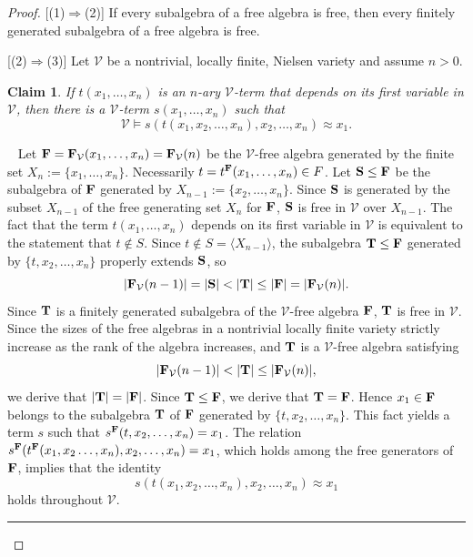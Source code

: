 \documentclass[12pt]{amsart}
\newtheorem{clm}[thm]{Claim}
\theoremstyle{definition}
\numberwithin{equation}{section}
\newcommand{\cproof}{\noindent{\it Proof of Claim.}\ } %
\newcommand{\cqed}{\hfill\rule{1.3mm}{3mm}}
\newcommand{\m}[1]{{\mathbf{\uppercase{#1}}}}
\begin{document}
\begin{proof}

[(1)$\Rightarrow$(2)] If every subalgebra of a free algebra
is free, then every finitely generated subalgebra
of a free algebra is free.

[(2)$\Rightarrow$(3)] 
Let $\mathcal V$ be a nontrivial, locally finite,
Nielsen variety and assume $n>0$.

\begin{clm} \label{main_clm}  
If
$t(x_1,\ldots,x_n)$ is an $n$-ary $\mathcal V$-term
that depends on its first variable in $\mathcal V$, then
there is a $\mathcal V$-term
$s(x_1,\ldots,x_n)$ such that
$$
\mathcal V\models s(t(x_1,x_2,\ldots,x_n),x_2,\ldots,x_n)\approx x_1.
$$
\end{clm}

\cproof
Let $\m f=\m f_{\mathcal V}(x_1,\ldots,x_n)=\m f_{\mathcal V}(n)$ be the
$\mathcal V$-free
algebra generated by the finite set $X_n:=\{x_1,\ldots,x_n\}$.
Necessarily $t=t^{\m f}(x_1,\ldots,x_n)\in F$.
Let $\m s\leq \m f$
be the subalgebra of $\m f$
generated by $X_{n-1}:=\{x_2,\ldots,x_n\}$.
Since $\m s$ is generated by the subset $X_{n-1}$
of the free generating set $X_n$ for $\m f$,
$\m s$ is free in $\mathcal V$ over $X_{n-1}$.
The fact that the term $t(x_1,\ldots,x_n)$ depends
on its first variable in $\mathcal V$
is equivalent to the statement
that $t\notin S$. Since $t\notin S=\langle X_{n-1}\rangle$,
the subalgebra $\m t\leq \m f$
generated by $\{t,x_2,\ldots,x_n\}$
properly extends $\m s$, so
\[
|\m f_{\mathcal V}(n-1)|=|\m s|<|\m t|\leq |\m F| = 
|\m f_{\mathcal V}(n)|.
\]
Since $\m t$ is a finitely generated subalgebra
of the $\mathcal V$-free algebra $\m f$, 
$\m t$ is free in $\mathcal V$.
Since the sizes of the free algebras
in a nontrivial locally finite variety
strictly increase as the rank of the algebra
increases, and $\m t$ is a $\mathcal{V}$-free algebra satisfying
\[
|\m f_{\mathcal V}(n-1)|<|\m t|\leq 
|\m f_{\mathcal V}(n)|,
\]
we derive that 
$|\m t| = |\m f|$.
Since $\m t\leq \m f$, we derive that $\m t=\m f$.
Hence $x_1\in \m f$ belongs to the subalgebra $\m t$ of $\m f$
generated
by $\{t,x_2,\ldots,x_n\}$. This fact yields a term
$s$ such that $s^{\m f}(t,x_2,\ldots,x_n)=x_1$.
The relation $s^{\m f}(t^{\m f}(x_1,x_2\ldots,x_n),x_2,\ldots,x_n)=x_1$,
which holds among the free generators
of $\m f$, implies that the identity
$$s(t(x_1,x_2,\ldots,x_n),x_2,\ldots,x_n)\approx x_1$$
holds throughout $\mathcal V$.
\cqed
\bigskip


\end{proof}
\end{document}
